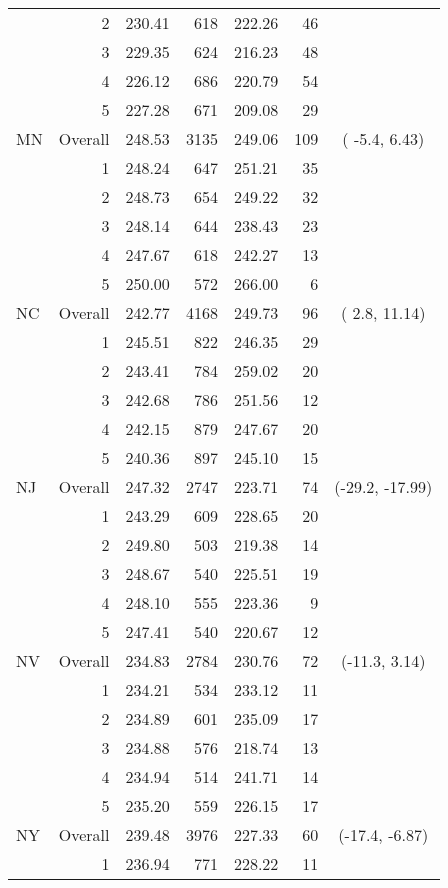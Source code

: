 \begin{longtable}{lrrr@{\extracolsep{.25cm}}rrc}
   & 2 & 230.41 & 618 & 222.26 &  46 &  \\ 
   & 3 & 229.35 & 624 & 216.23 &  48 &  \\ 
   & 4 & 226.12 & 686 & 220.79 &  54 &  \\ 
   & 5 & 227.28 & 671 & 209.08 &  29 &  \\ 
   \hline
MN & Overall & 248.53 & 3135 & 249.06 & 109 & ( -5.4,   6.43) \\ 
   & 1 & 248.24 & 647 & 251.21 &  35 &  \\ 
   & 2 & 248.73 & 654 & 249.22 &  32 &  \\ 
   & 3 & 248.14 & 644 & 238.43 &  23 &  \\ 
   & 4 & 247.67 & 618 & 242.27 &  13 &  \\ 
   & 5 & 250.00 & 572 & 266.00 &   6 &  \\ 
   \hline
NC & Overall & 242.77 & 4168 & 249.73 &  96 & (  2.8,  11.14) \\ 
   & 1 & 245.51 & 822 & 246.35 &  29 &  \\ 
   & 2 & 243.41 & 784 & 259.02 &  20 &  \\ 
   & 3 & 242.68 & 786 & 251.56 &  12 &  \\ 
   & 4 & 242.15 & 879 & 247.67 &  20 &  \\ 
   & 5 & 240.36 & 897 & 245.10 &  15 &  \\ 
   \hline
NJ & Overall & 247.32 & 2747 & 223.71 &  74 & (-29.2, -17.99) \\ 
   & 1 & 243.29 & 609 & 228.65 &  20 &  \\ 
   & 2 & 249.80 & 503 & 219.38 &  14 &  \\ 
   & 3 & 248.67 & 540 & 225.51 &  19 &  \\ 
   & 4 & 248.10 & 555 & 223.36 &   9 &  \\ 
   & 5 & 247.41 & 540 & 220.67 &  12 &  \\ 
   \hline
NV & Overall & 234.83 & 2784 & 230.76 &  72 & (-11.3,   3.14) \\ 
   & 1 & 234.21 & 534 & 233.12 &  11 &  \\ 
   & 2 & 234.89 & 601 & 235.09 &  17 &  \\ 
   & 3 & 234.88 & 576 & 218.74 &  13 &  \\ 
   & 4 & 234.94 & 514 & 241.71 &  14 &  \\ 
   & 5 & 235.20 & 559 & 226.15 &  17 &  \\ 
   \hline
NY & Overall & 239.48 & 3976 & 227.33 &  60 & (-17.4,  -6.87) \\ 
   & 1 & 236.94 & 771 & 228.22 &  11 &  \\ 

\end{longtable}
